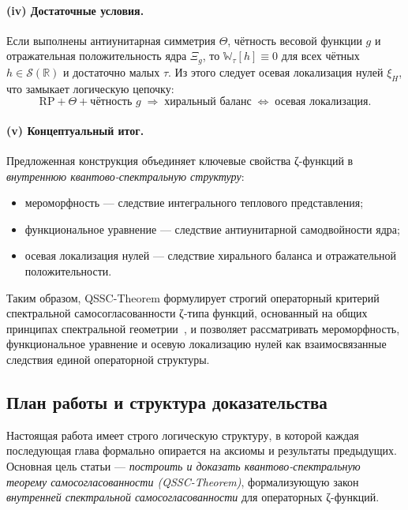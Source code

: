 \documentclass{article}
\numberwithin{equation}{section}
\theoremstyle{plain}
\theoremstyle{definition}
\theoremstyle{remark}
\def\Rightarrow{⇒}%
\def\Leftrightarrow{⇔}%
\begin{document}
\paragraph{(iv) Достаточные условия.}
Если выполнены антиунитарная симметрия $\Theta$, чётность весовой функции $g$
и отражательная положительность ядра $\Xi_g$, то $\mathbb W_\tau[h]\equiv 0$
для всех чётных $h\in\mathcal S(\mathbb R)$ и достаточно малых $\tau$.
Из этого следует осевая локализация нулей $\xi_H$, что замыкает логическую цепочку:
\begin{equation}
\text{RP}+\Theta+\text{чётность }g
\;\Rightarrow\;
\text{хиральный баланс}
\;\Leftrightarrow\;
\text{осевая локализация}.
\label{eq:QSSC0004}
\end{equation}

\paragraph{(v) Концептуальный итог.}
Предложенная конструкция объединяет ключевые свойства ζ-функций
в \emph{внутреннюю квантово-спектральную структуру}:
\begin{itemize}
  \item мероморфность — следствие интегрального теплового представления;
  \item функциональное уравнение — следствие антиунитарной самодвойности ядра;
  \item осевая локализация нулей — следствие хирального баланса и отражательной положительности.
\end{itemize}
Таким образом, QSSC-Theorem формулирует строгий операторный критерий спектральной самосогласованности ζ-типа функций,
основанный на общих принципах спектральной геометрии~\cite{Connes1999,HelfferRobert1984,BaezSegal2000},
и позволяет рассматривать мероморфность, функциональное уравнение и осевую локализацию нулей
как взаимосвязанные следствия единой операторной структуры.

\subsection{План работы и структура доказательства}
\label{subsec:structure}

\noindent
Настоящая работа имеет строго логическую структуру, в которой каждая последующая глава
формально опирается на аксиомы и результаты предыдущих.
Основная цель статьи — \textit{построить и доказать квантово-спектральную теорему самосогласованности (QSSC-Theorem)},
формализующую закон \emph{внутренней спектральной самосогласованности}
для операторных ζ-функций.
\end{document}
